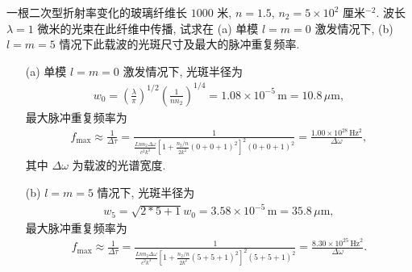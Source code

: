 \documentclass[twoside]{note}
\begin{document}
\begin{exe}
    一根二次型折射率变化的玻璃纤维长 $1000$ 米, $n=1.5$, $n_2=5\times 10^2$ 厘米${}^{-2}$. 波长 $\lambda=1$ 微米的光束在此纤维中传播, 试求在 (a) 单模 $l=m=0$ 激发情况下, (b) $l=m=5$ 情况下此载波的光斑尺寸及最大的脉冲重复频率.
\end{exe}
\begin{sol}
    \begin{itemize}
        \item[(a)] 单模 $l=m=0$ 激发情况下, 光斑半径为
        \begin{align}
            w_0=\left(\frac{\lambda}{\pi}\right)^{1/2}\left(\frac{1}{nn_2}\right)^{1/4}=1.08\times 10^{-5}\,\text{m}=10.8\,\mu\text{m},
        \end{align}
        最大脉冲重复频率为
        \begin{align}
            f_{\max}\approx\frac{1}{\Delta\tau}=\frac{1}{\frac{Lnn_2\Delta\omega}{c^2k^3}\left[1+\frac{n_2/n}{2k^2}(0+0+1)^2\right]^2(0+0+1)^2}=\frac{1.00\times 10^{28}\,\text{Hz}^2}{\Delta\omega},
        \end{align}
        其中 $\Delta\omega$ 为载波的光谱宽度.
        \item[(b)] $l=m=5$ 情况下, 光斑半径为
        \begin{align}
            w_5=\sqrt{2*5+1}w_0=3.58\times 10^{-5}\,\text{m}=35.8\,\mu\text{m},
        \end{align}
        最大脉冲重复频率为
        \begin{align}
            f_{\max}\approx\frac{1}{\Delta\tau}=\frac{1}{\frac{Lnn_2\Delta\omega}{c^2k^3}\left[1+\frac{n_2/n}{2k^2}(5+5+1)^2\right]^2(5+5+1)^2}=\frac{8.30\times 10^{25}\,\text{Hz}^2}{\Delta\omega}.
        \end{align}
    \end{itemize}
\end{sol}
\end{document}
